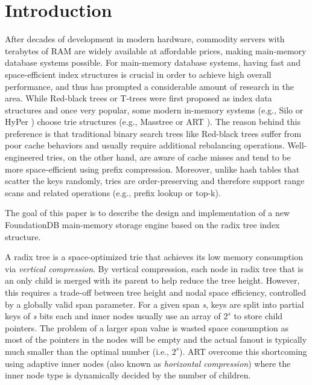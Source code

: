 \documentclass[sigplan,screen,nonacm]{acmart}
\begin{document}
\maketitle

\section{Introduction}
\label{sec:intro}
After decades of development in modern hardware, commodity servers with terabytes of RAM are widely available at affordable prices, making main-memory database systems possible. For main-memory database systems, having fast and space-efficient index structures is crucial in order to achieve high overall performance, and thus has prompted a considerable amount of research in the area. While Red-black trees \cite{bayer1972symmetric} or T-trees \cite{lehman1985study} were first proposed as index data structures and once very popular, some modern in-memory systems (e.g., Silo \cite{tu2013speedy} or HyPer \cite{kemper2011hyper}) choose trie structures (e.g., Masstree \cite{mao2012cache} or ART \cite{leis2013adaptive}). The reason behind this preference is that traditional binary search trees like Red-black trees suffer from poor cache behaviors \cite{rao1998cache} and usually require additional rebalancing operations. Well-engineered tries, on the other hand, are aware of cache misses and tend to be more space-efficient using prefix compression. Moreover, unlike hash tables that scatter the keys randomly, tries are order-preserving and therefore support range scans and related operations (e.g., prefix lookup or top-k).

The goal of this paper is to describe the design and implementation of a new FoundationDB main-memory storage engine based on the radix tree index structure. 

A radix tree \cite{morrison1968patricia} is a space-optimized trie that achieves its low memory consumption via {\itshape vertical compression}. By vertical compression, each node in radix tree that is an only child is merged with its parent to help reduce the tree height. However, this requires a trade-off between tree height and nodal space efficiency, controlled by a globally valid span parameter. For a given span {\itshape s}, keys are split into partial keys of {\itshape s} bits each and inner nodes usually use an array of $2^{s}$ to store child pointers. The problem of a larger span value is wasted space consumption as most of the pointers in the nodes will be empty and the actual fanout is typically much smaller than the optimal number (i.e., $2^{s}$). ART \cite{leis2013adaptive} overcome this shortcoming using adaptive inner nodes (also known as {\itshape horizontal compression}) where the inner node type is dynamically decided by the number of children. 
\end{document}
